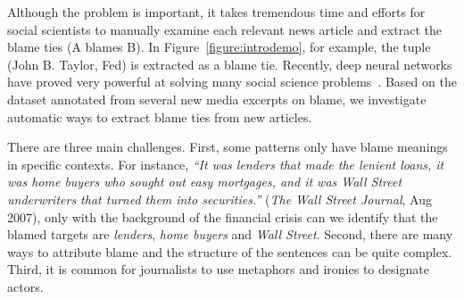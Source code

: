 \documentclass[letterpaper]{article} %
\begin{document}
Although the problem is important, it takes tremendous time and efforts for social scientists to manually examine each relevant news article and extract the blame ties (A blames B). In Figure~\ref{figure:introdemo}, for example, the tuple (John B. Taylor, Fed) is extracted as a blame tie. Recently, deep neural networks have proved very powerful at solving many social science problems~\cite{li-hovy:2014:EMNLP20141,rule2015lexical,bail2016combining}. Based on the dataset annotated from several new media excerpts on blame, we investigate automatic ways to extract blame ties from new articles.

There are three main challenges. First, some patterns only have blame meanings in specific contexts. For instance, {\it ``It was lenders that made the lenient loans, it was home buyers who sought out easy mortgages, and it was Wall Street underwriters that turned them into securities.''} ({\it The Wall Street Journal}, Aug 2007), only with the background of the financial crisis can we identify that the blamed targets are {\it lenders}, {\it home buyers} and {\it Wall Street}. Second, there are many ways to attribute blame and the structure of the sentences can be quite complex. Third, it is common for journalists to use metaphors and ironies to designate actors.
\end{document}
